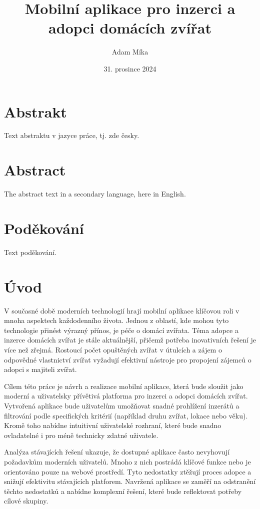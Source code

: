 \documentclass[12pt,a4paper]{report}
\title{Mobilní aplikace pro inzerci a adopci domácích zvířat}
\author{Adam Míka}
\date{31. prosince 2024}
\begin{document}
\maketitle

\chapter*{Abstrakt}
Text abstraktu v jazyce práce, tj. zde česky.

\chapter*{Abstract}
The abstract text in a secondary language, here in English.

\chapter*{Poděkování}
Text poděkování.

\tableofcontents

\chapter{Úvod}
V současné době moderních technologií hrají mobilní aplikace klíčovou roli v mnoha aspektech každodenního života. Jednou z oblastí, kde mohou tyto technologie přinést výrazný přínos, je péče o domácí zvířata. Téma adopce a inzerce domácích zvířat je stále aktuálnější, přičemž potřeba inovativních řešení je více než zřejmá. Rostoucí počet opuštěných zvířat v útulcích a zájem o odpovědné vlastnictví zvířat vyžadují efektivní nástroje pro propojení zájemců o adopci s majiteli zvířat.

Cílem této práce je návrh a realizace mobilní aplikace, která bude sloužit jako moderní a uživatelsky přívětivá platforma pro inzerci a adopci domácích zvířat. Vytvořená aplikace bude uživatelům umožňovat snadné prohlížení inzerátů a filtrování podle specifických kritérií (například druhu zvířat, lokace nebo věku). Kromě toho nabídne intuitivní uživatelské rozhraní, které bude snadno ovladatelné i pro méně technicky zdatné uživatele.

Analýza stávajících řešení ukazuje, že dostupné aplikace často nevyhovují požadavkům moderních uživatelů. Mnoho z nich postrádá klíčové funkce nebo je orientováno pouze na webové prostředí. Tyto nedostatky ztěžují proces adopce a snižují efektivitu stávajících platforem. Navržená aplikace se zaměří na odstranění těchto nedostatků a nabídne komplexní řešení, které bude reflektovat potřeby cílové skupiny.
\end{document}
